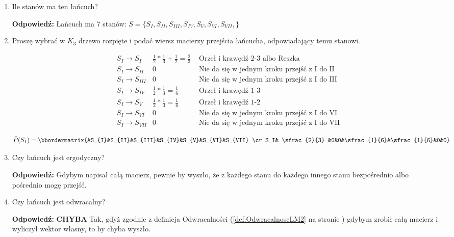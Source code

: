 \begin{enumerate}[label=\alph*)]
\item Ile stanów ma ten łańcuch?

\textbf{Odpowiedź:} Łańcuch ma 7 stanów: $S=\{S_{I},S_{II},S_{III},S_{IV},S_{V},S_{VI},S_{VII},\}$
\item Proszę wybrać w $K_3$ drzewo rozpięte i podać wiersz macierzy przejścia łańcucha, odpowiadający temu stanowi.

\begin{align*}
&S_{I}\rightarrow S_{I}   & \frac{1}{2}*\frac{1}{3}+\frac{1}{2}=\frac{2}{3} &\text{ Orzeł i krawędź 2-3 albo Reszka}\\
&S_{I}\rightarrow S_{II}  & 0 &\text{ Nie da się w jednym kroku przejść z I do II}\\
&S_{I}\rightarrow S_{III} & 0 &\text{ Nie da się w jednym kroku przejść z I do III}\\
&S_{I}\rightarrow S_{IV}  & \frac{1}{2}*\frac{1}{3}=\frac{1}{6} &\text{ Orzeł i krawędź 1-3}\\
&S_{I}\rightarrow S_{V}   & \frac{1}{2}*\frac{1}{3}=\frac{1}{6} &\text{ Orzeł i krawędź 1-2}\\
&S_{I}\rightarrow S_{VI}  & 0 &\text{ Nie da się w jednym kroku przejść z I do VI}\\
&S_{I}\rightarrow S_{VII} & 0 &\text{ Nie da się w jednym kroku przejść z I do VII}
\end{align*}

$$\bar{P}(S_I)=\bbordermatrix{&S_{I}&S_{II}&S_{III}&S_{IV}&S_{V}&S_{VI}&S_{VII} \cr
S_I& \sfrac{2}{3} &0&0&\sfrac{1}{6}&\sfrac{1}{6}&0&0}$$
\item Czy łańcuch jest ergodyczny?

\textbf{Odpowiedź: }Gdybym napisał całą macierz, pewnie by wyszło, że z każdego stanu do każdego innego stanu bezpośrednio albo pośrednio mogę przejść.
\item Czy łańcuch jest odwracalny?

\textbf{Odpowiedź: }\textbf{CHYBA }Tak, gdyż zgodnie z definicja Odwracalności (\ref{def:OdwracalnoscLM2} na stronie \pageref{def:OdwracalnoscLM2}) gdybym zrobił całą macierz i wyliczył wektor własny, to by chyba wyszło.
\end{enumerate}

